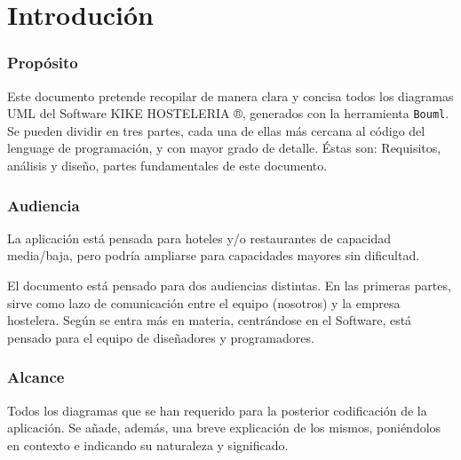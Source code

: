 \documentclass[spanish,a4paper,11pt, twoside]{report}	%
\begin{document}
\newpage
\mbox{}
\thispagestyle{empty}						%
\newpage


\tableofcontents 							%

\newpage
\mbox{}
\thispagestyle{empty}						%
\newpage



\setcounter{section}{0}
\part{Introdución}
	\section{Propósito}
	Este documento pretende recopilar de manera clara y concisa todos los diagramas UML del Software KIKE HOSTELERIA ®, generados con la herramienta \texttt{Bouml}. Se pueden dividir en tres partes, cada una de ellas más cercana al código del lenguage de programación, y con mayor grado de detalle. Éstas son: Requisitos, análisis y diseño, partes fundamentales de este documento.

	\section{Audiencia} 
	La aplicación está pensada para hoteles y/o restaurantes de capacidad media/baja, pero podría ampliarse para capacidades mayores sin dificultad.

	El documento está pensado para dos audiencias distintas. En las primeras partes, sirve como lazo de comunicación entre el equipo (nosotros) y la empresa hostelera. Según se entra más en materia, centrándose en el Software, está pensado para el equipo de diseñadores y programadores.

	\section{Alcance}
	Todos los diagramas que se han requerido para la posterior codificación de la aplicación. Se añade, además, una breve explicación de los mismos, poniéndolos en contexto e indicando su naturaleza y significado.
\end{document}
